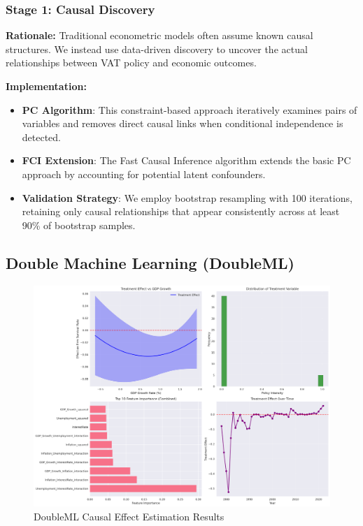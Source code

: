 \subsubsection{Stage 1: Causal Discovery}
\textbf{Rationale:} Traditional econometric models often assume known causal structures. We instead use data-driven discovery to uncover the actual relationships between VAT policy and economic outcomes.

\textbf{Implementation:}
\begin{itemize}
    \item \textbf{PC Algorithm}: This constraint-based approach iteratively examines pairs of variables and removes direct causal links when conditional independence is detected.
    \item \textbf{FCI Extension}: The Fast Causal Inference algorithm extends the basic PC approach by accounting for potential latent confounders.
    \item \textbf{Validation Strategy}: We employ bootstrap resampling with 100 iterations, retaining only causal relationships that appear consistently across at least 90\% of bootstrap samples.
\end{itemize}

\subsection{Double Machine Learning (DoubleML)}\label{subsec:doubleml}
\begin{figure}[H]
    \centering
    \includegraphics[width=\textwidth]{figures/dml_analysis_results.png}
    \caption{DoubleML Causal Effect Estimation Results}
    \label{fig:dml_analysis_results}
\end{figure}

